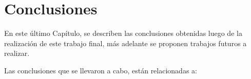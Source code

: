 



\section{Conclusiones}

En este último Capítulo, se describen las conclusiones obtenidas luego de la realización de este trabajo final, más adelante se proponen trabajos futuros a realizar. 

Las conclusiones que se llevaron a cabo, están relacionadas a: 

